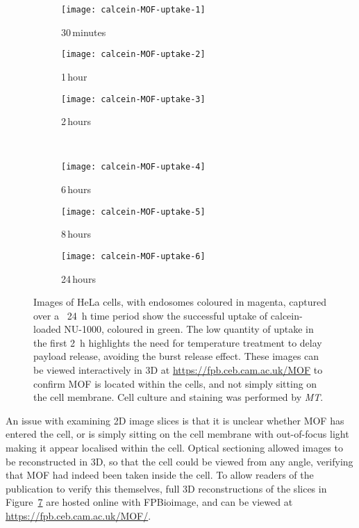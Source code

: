 \begin{figure}[tbp]
\centering
\begin{subfigure}[b]{0.325\textwidth}
	\texttt{[image: calcein-MOF-uptake-1]}
	\caption{30\,minutes}\label{fig:calcein-MOF-uptake-1}
\end{subfigure}
\hfill
\begin{subfigure}[b]{0.325\textwidth}
	\texttt{[image: calcein-MOF-uptake-2]}
	\caption{1\,hour}\label{fig:calcein-MOF-uptake-2}
\end{subfigure}
\hfill
\begin{subfigure}[b]{0.325\textwidth}
	\texttt{[image: calcein-MOF-uptake-3]}
	\caption{2\,hours}\label{fig:calcein-MOF-uptake-3}
\end{subfigure}

~\newline
\begin{subfigure}[b]{0.325\textwidth}
	\texttt{[image: calcein-MOF-uptake-4]}
	\caption{6\,hours}\label{fig:calcein-MOF-uptake-4}
\end{subfigure}
\hfill
\begin{subfigure}[b]{0.325\textwidth}
	\texttt{[image: calcein-MOF-uptake-5]}
	\caption{8\,hours}\label{fig:calcein-MOF-uptake-5}
\end{subfigure}
\hfill
\begin{subfigure}[b]{0.325\textwidth}
	\texttt{[image: calcein-MOF-uptake-6]}
	\caption{24\,hours}\label{fig:calcein-MOF-uptake-6}
\end{subfigure}
\caption[MOFs: Calcein-loaded NU-1000 is taken up by cells over a \SI{24}{\hour} period]{Images of HeLa cells, with endosomes coloured in magenta, captured over a ~\SI{24}{\hour} time period show the successful uptake of calcein-loaded NU-1000, coloured in green. The low quantity of uptake in the first \SI{2}{\hour} highlights the need for temperature treatment to delay payload release, avoiding the burst release effect. These images can be viewed interactively in 3D at \url{https://fpb.ceb.cam.ac.uk/MOF} to confirm MOF is located within the cells, and not simply sitting on the cell membrane. Cell culture and staining was performed by \textit{MT}. }
\label{fig:calcein-MOF-uptake}
\end{figure}

An issue with examining 2D image slices is that it is unclear whether MOF has entered the cell, or is simply sitting on the cell membrane with out-of-focus light making it appear localised within the cell.
Optical sectioning allowed images to be reconstructed in 3D, so that the cell could be viewed from any angle, verifying that MOF had indeed been taken inside the cell.
To allow readers of the publication to verify this themselves, full 3D reconstructions of the slices in Figure~\ref{fig:calcein-MOF-uptake} are hosted online with FPBioimage, and can be viewed at \url{https://fpb.ceb.cam.ac.uk/MOF/}.

